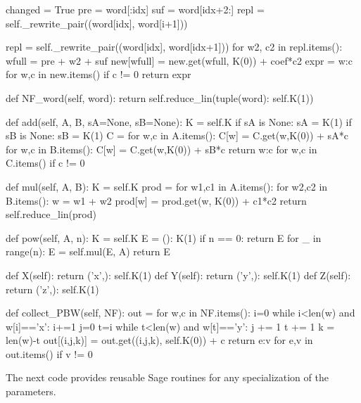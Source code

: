 \documentclass{amsart}
\theoremstyle{definition}
\theoremstyle{remark}
\numberwithin{equation}{section}
\begin{document}
\begin{MyVerbatim}
                changed = True
                pre = word[:idx]
                suf = word[idx+2:]
                repl = self._rewrite_pair((word[idx], word[i+1]))

                repl = self._rewrite_pair((word[idx], word[idx+1]))
                for w2, c2 in repl.items():
                    wfull = pre + w2 + suf
                    new[wfull] = new.get(wfull, K(0)) + coef*c2
            expr = {w:c for w,c in new.items() if c != 0}
        return expr

    def NF_word(self, word):
        return self.reduce_lin({tuple(word): self.K(1)})

    def add(self, A, B, sA=None, sB=None):
        K = self.K
        if sA is None: sA = K(1)
        if sB is None: sB = K(1)
        C = {}
        for w,c in A.items():
            C[w] = C.get(w,K(0)) + sA*c
        for w,c in B.items():
            C[w] = C.get(w,K(0)) + sB*c
        return {w:c for w,c in C.items() if c != 0}

    def mul(self, A, B):
        K = self.K
        prod = {}
        for w1,c1 in A.items():
            for w2,c2 in B.items():
                w = w1 + w2
                prod[w] = prod.get(w, K(0)) + c1*c2
        return self.reduce_lin(prod)

    def pow(self, A, n):
        K = self.K
        E = {(): K(1)}
        if n == 0:
            return E
        for _ in range(n):
            E = self.mul(E, A)
        return E

    def X(self): return {('x',): self.K(1)}
    def Y(self): return {('y',): self.K(1)}
    def Z(self): return {('z',): self.K(1)}

    def collect_PBW(self, NF):
        out = {}
        for w,c in NF.items():
            i=0
            while i<len(w) and w[i]=='x': i+=1
            j=0
            t=i
            while t<len(w) and w[t]=='y':
                j += 1
                t += 1
            k = len(w)-t
            out[(i,j,k)] = out.get((i,j,k), self.K(0)) + c
        return {e:v for e,v in out.items() if v != 0}
\end{MyVerbatim}

The next code provides reusable Sage routines for any specialization of the parameters.
\end{document}
